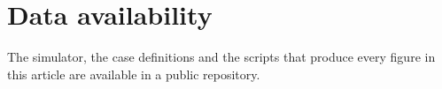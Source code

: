 \documentclass[a4paper,fleqn]{cas-sc}
\begin{document}
\section*{Data availability}
The simulator, the case definitions and the scripts that produce every figure in this article are available in a public repository.


\printcredits



\end{document}
